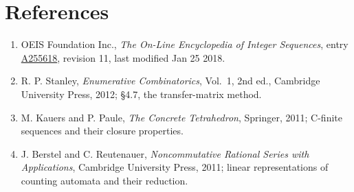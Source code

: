 \documentclass[11pt]{article}
\theoremstyle{definition}
\begin{document}
\section{References}

\begin{enumerate}

\item OEIS Foundation Inc., \emph{The On-Line Encyclopedia of Integer Sequences}, entry \href{https://oeis.org/A255618}{A255618}, revision 11, last modified Jan 25 2018.

\item R. P. Stanley, \emph{Enumerative Combinatorics}, Vol.~1, 2nd ed., Cambridge University Press, 2012; \S4.7, the transfer-matrix method.

\item M. Kauers and P. Paule, \emph{The Concrete Tetrahedron}, Springer, 2011; C-finite sequences and their closure properties.

\item J. Berstel and C. Reutenauer, \emph{Noncommutative Rational Series with Applications}, Cambridge University Press, 2011; linear representations of counting automata and their reduction.

\end{enumerate}
\end{document}
